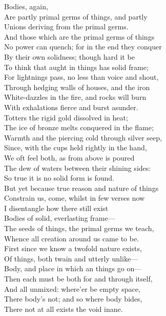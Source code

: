 Bodies, again,\\
Are partly primal germs of things, and partly\\
Unions deriving from the primal germs.\\
And those which are the primal germs of things\\
No power can quench; for in the end they conquer\\
By their own solidness; though hard it be\\
To think that aught in things has solid frame;\\
For lightnings pass, no less than voice and shout,\\
Through hedging walls of houses, and the iron\\
White-dazzles in the fire, and rocks will burn\\
With exhalations fierce and burst asunder.\\
Totters the rigid gold dissolved in heat;\\
The ice of bronze melts conquered in the flame;\\
Warmth and the piercing cold through silver seep,\\
Since, with the cups held rightly in the hand,\\
We oft feel both, as from above is poured\\
The dew of waters between their shining sides:\\
So true it is no solid form is found.\\
But yet because true reason and nature of things\\
Constrain us, come, whilst in few verses now\\
I disentangle how there still exist\\
Bodies of solid, everlasting frame—\\
The seeds of things, the primal germs we teach,\\
Whence all creation around us came to be.\\
First since we know a twofold nature exists,\\
Of things, both twain and utterly unlike—\\
Body, and place in which an things go on—\\
Then each must be both for and through itself,\\
And all unmixed: where'er be empty space,\\
There body's not; and so where body bides,\\
There not at all exists the void inane.\\
